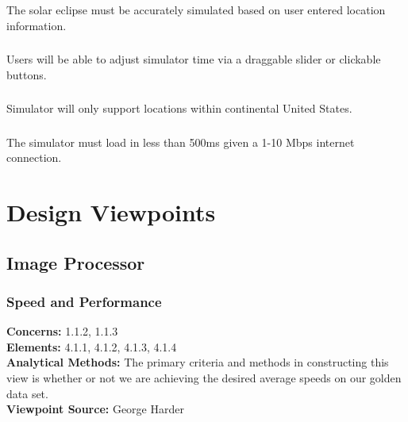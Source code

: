 \documentclass[10pt, onecolumn, draftclsnofoot, letterpaper, compsoc]{IEEEtran}
\begin{document}
    \subsubsection{}
    The solar eclipse must be accurately simulated based on
    user entered location information. \\
    
    \subsubsection{}
    Users will be able to adjust simulator time via a
    draggable slider or clickable buttons. \\
    
    \subsubsection{}
    Simulator will only support locations within continental
    United States. \\
    
    \subsubsection{}
    The simulator must load in less than 500ms given a 1-10
    Mbps internet connection. \\
    

\section{Design Viewpoints}

\subsection{Image Processor}

\subsubsection{Speed and Performance}

\textbf{Concerns:} 1.1.2, 1.1.3 \\
\textbf{Elements:} 4.1.1, 4.1.2, 4.1.3, 4.1.4\\
\textbf{Analytical Methods:} The primary criteria and methods in constructing
this view is whether or not we are achieving the desired average speeds on our
golden data set. \\
\textbf{Viewpoint Source:} George Harder \\
\end{document}
